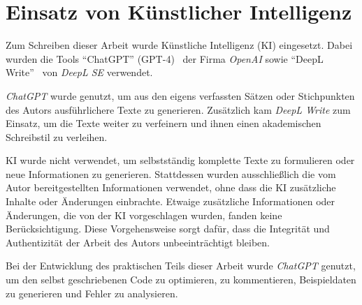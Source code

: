\section{Einsatz von Künstlicher Intelligenz}
Zum Schreiben dieser Arbeit wurde Künstliche Intelligenz (KI) eingesetzt.
Dabei wurden die Tools \enquote{ChatGPT} (GPT-4)~\cite{openai_chatgpt_nodate} der Firma \emph{OpenAI} sowie \enquote{DeepL Write}~\cite{deepl_se_deepl_nodate} von \emph{DeepL SE} verwendet.

\emph{ChatGPT} wurde genutzt, um aus den eigens verfassten Sätzen oder Stichpunkten des Autors ausführlichere Texte zu generieren.
Zusätzlich kam \emph{DeepL Write} zum Einsatz, um die Texte weiter zu verfeinern und ihnen einen akademischen Schreibstil zu verleihen.

KI wurde nicht verwendet, um selbstständig komplette Texte zu formulieren oder neue Informationen zu generieren.
Stattdessen wurden ausschließlich die vom Autor bereitgestellten Informationen verwendet, ohne dass die KI zusätzliche Inhalte oder Änderungen einbrachte.
Etwaige zusätzliche Informationen oder Änderungen, die von der KI vorgeschlagen wurden, fanden keine Berücksichtigung.
Diese Vorgehensweise sorgt dafür, dass die Integrität und Authentizität der Arbeit des Autors unbeeinträchtigt bleiben.

Bei der Entwicklung des praktischen Teils dieser Arbeit wurde \emph{ChatGPT} genutzt, um den selbst geschriebenen Code zu optimieren, zu kommentieren, Beispieldaten zu generieren und Fehler zu analysieren.